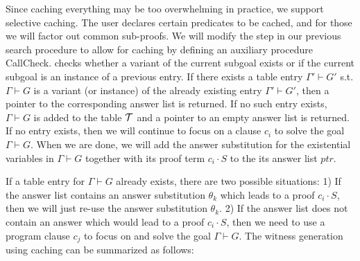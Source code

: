 \documentclass{llncs}
\newcommand{\vd}{\vdash}
\begin{document}
Since caching everything may be too overwhelming in practice, we
support selective caching. The user declares certain predicates to be
cached, and for those we will factor out common sub-proofs. We will
modify the {} step in our previous search procedure to
allow for caching by defining an auxiliary procedure {\sf
CallCheck}. {\sf{CallCheck($\Gamma \vd G, \cal{T}$)}} checks whether a
variant of the current subgoal exists or if the current subgoal is an
instance of a previous entry. If there exists a table entry $\Gamma'
\vd G'$ s.t. $\Gamma \vd G$ is a variant (or instance) of the already
existing entry $\Gamma' \vd G'$, then a pointer to the corresponding
answer list is returned. If no such entry exists, $\Gamma \vd G$ is
added to the table $\cal{T}$ and a pointer to an empty answer list is
returned. If no entry exists, then we will continue to focus on a
clause $c_i$ to solve the goal $\Gamma \vd G$. When we are done, we
will add the answer substitution for the existential variables in
$\Gamma \vd G$ together with its proof term $c_i \cdot S$ to the its
answer list $ptr$.

If a table entry for $\Gamma \vd G$ already exists, there are two
possible situations: 1) If the answer list contains an answer
substitution $\theta_k$  which leads to a proof $c_i \cdot S$,
then we will just re-use the answer substitution $\theta_k$. 2) If the
answer list does not contain an answer which would lead to a proof
$c_i \cdot S$, then we need to use a program clause $c_j$ to focus on
and solve the goal $\Gamma \vd G$. The witness generation using
caching can be summarized as follows:
\end{document}
